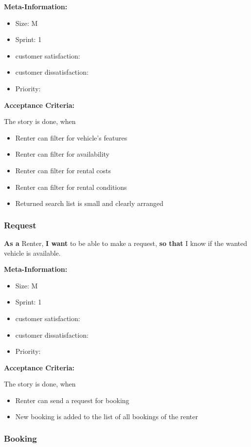 \textbf{Meta-Information:}
\begin{itemize}
    \item Size: M
    \item Sprint: 1
    \item customer satisfaction:
    \item customer dissatisfaction:
    \item Priority:
\end{itemize}

\textbf{Acceptance Criteria:}

The story is done, when
\begin{itemize}
    \item Renter can filter for vehicle's features
    \item Renter can filter for availability
    \item Renter can filter for rental costs
    \item Renter can filter for rental conditions
    \item Returned search list is small and clearly arranged
\end{itemize}

\subsubsection{Request}

\textbf{As a} Renter,\hfill\break
\textbf{I want} to be able to make a request,\hfill\break
\textbf{so that} I know if the wanted vehicle is available.

\textbf{Meta-Information:}
\begin{itemize}
    \item Size: M
    \item Sprint: 1
    \item customer satisfaction:
    \item customer dissatisfaction:
    \item Priority:
\end{itemize}

\textbf{Acceptance Criteria:}

The story is done, when
\begin{itemize}
    \item Renter can send a request for booking
    \item New booking is added to the list of all bookings of the renter
\end{itemize}


\subsubsection{Booking}

